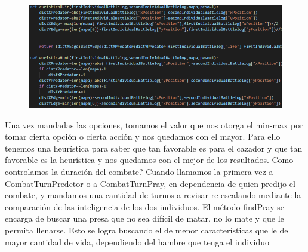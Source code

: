 \documentclass{llncs}
\begin{document}
\begin{figure}
	\centering
	\includegraphics[width=0.7\linewidth]{imagenesMisc/HeuristicHH}
	\label{fig:heuristichh}
\end{figure}

Una vez mandadas las opciones, tomamos el valor que nos otorga el min-max por tomar cierta opción o cierta acción y nos quedamos con el mayor. Para ello tenemos una heurística para saber que tan favorable es para el cazador y que tan favorable es la heurística y nos quedamos con el mejor de los resultados.
\newline
\newline
Como controlamos la duración del combate?
\newline
\newline
Cuando llamamos la primera vez a CombatTurnPredetor o a CombatTurnPray, en dependencia de quien predijo el combate, y mandamos una cantidad de turnos a revisar re escalando mediante la comparación de las inteligencia de los dos individuos.
\newline
\newline
El método findPray se encarga de buscar una presa que no sea difícil de matar, no lo mate y que le permita llenarse. Esto se logra buscando el de menor características que le de mayor cantidad de vida, dependiendo del hambre que tenga el individuo
\end{document}
